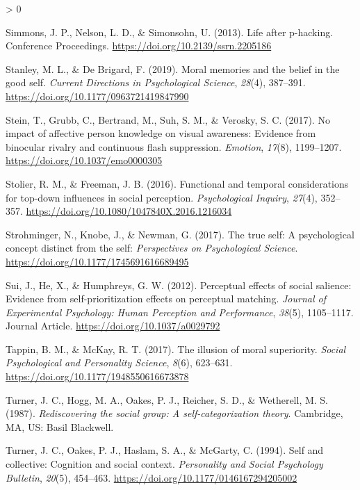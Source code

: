 \documentclass[
  english,
  man]{apa6}
\newlength{\cslhangindent}
\newenvironment{CSLReferences}[2] %
 {%
  \setlength{\parindent}{0pt}
  \ifodd #1 \everypar{\setlength{\hangindent}{\cslhangindent}}\ignorespaces\fi
  \ifnum #2 > 0
  \setlength{\parskip}{#2\baselineskip}
  \fi
 }%
 {}
\begin{document}
\begin{CSLReferences}{1}{0}
\leavevmode\hypertarget{ref-Simmons_2013_life}{}%
Simmons, J. P., Nelson, L. D., \& Simonsohn, U. (2013). Life after p-hacking. Conference Proceedings. \url{https://doi.org/10.2139/ssrn.2205186}

\leavevmode\hypertarget{ref-stanley_moral_2019}{}%
Stanley, M. L., \& De Brigard, F. (2019). Moral memories and the belief in the good self. \emph{Current Directions in Psychological Science}, \emph{28}(4), 387--391. \url{https://doi.org/10.1177/0963721419847990}

\leavevmode\hypertarget{ref-stein_no_2017}{}%
Stein, T., Grubb, C., Bertrand, M., Suh, S. M., \& Verosky, S. C. (2017). No impact of affective person knowledge on visual awareness: Evidence from binocular rivalry and continuous flash suppression. \emph{Emotion}, \emph{17}(8), 1199--1207. \url{https://doi.org/10.1037/emo0000305}

\leavevmode\hypertarget{ref-stolier_functional_2016}{}%
Stolier, R. M., \& Freeman, J. B. (2016). Functional and temporal considerations for top-down influences in social perception. \emph{Psychological Inquiry}, \emph{27}(4), 352--357. \url{https://doi.org/10.1080/1047840X.2016.1216034}

\leavevmode\hypertarget{ref-strohminger_true_2017}{}%
Strohminger, N., Knobe, J., \& Newman, G. (2017). The true self: A psychological concept distinct from the self: \emph{Perspectives on Psychological Science}. \url{https://doi.org/10.1177/1745691616689495}

\leavevmode\hypertarget{ref-Sui_2012_JEPHPP}{}%
Sui, J., He, X., \& Humphreys, G. W. (2012). Perceptual effects of social salience: Evidence from self-prioritization effects on perceptual matching. \emph{Journal of Experimental Psychology: Human Perception and Performance}, \emph{38}(5), 1105--1117. Journal Article. \url{https://doi.org/10.1037/a0029792}

\leavevmode\hypertarget{ref-tappin_illusion_2017}{}%
Tappin, B. M., \& McKay, R. T. (2017). The illusion of moral superiority. \emph{Social Psychological and Personality Science}, \emph{8}(6), 623--631. \url{https://doi.org/10.1177/1948550616673878}

\leavevmode\hypertarget{ref-turner_rediscovering_1987}{}%
Turner, J. C., Hogg, M. A., Oakes, P. J., Reicher, S. D., \& Wetherell, M. S. (1987). \emph{Rediscovering the social group: A self-categorization theory}. Cambridge, {MA}, {US}: Basil Blackwell.

\leavevmode\hypertarget{ref-turner_self_1994}{}%
Turner, J. C., Oakes, P. J., Haslam, S. A., \& McGarty, C. (1994). Self and collective: Cognition and social context. \emph{Personality and Social Psychology Bulletin}, \emph{20}(5), 454--463. \url{https://doi.org/10.1177/0146167294205002}


\end{CSLReferences}
\end{document}
